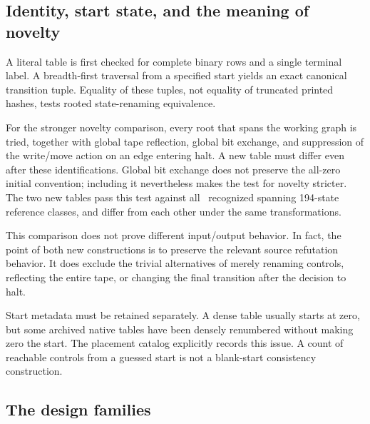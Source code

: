 \documentclass[11pt]{article}
\begin{document}
\subsection{Identity, start state, and the meaning of novelty}

A literal table is first checked for complete binary rows and a single
terminal label. A breadth-first traversal from a specified start yields an
exact canonical transition tuple. Equality of these tuples, not equality
of truncated printed hashes, tests rooted state-renaming equivalence.

For the stronger novelty comparison, every root that spans the working
graph is tried, together with global tape reflection, global bit exchange,
and suppression of the write/move action on an edge entering halt. A new
table must differ even after these identifications. Global bit exchange
does not preserve the all-zero initial convention; including it nevertheless
makes the test for novelty stricter. The two new tables pass this test
against all \FrontierClasses\ recognized spanning 194-state reference classes,
and differ from each other under the same transformations.

This comparison does not prove different input/output behavior. In fact,
the point of both new constructions is to preserve the relevant source
refutation behavior. It does exclude the trivial alternatives of merely
renaming controls, reflecting the entire tape, or changing the final
transition after the decision to halt.

Start metadata must be retained separately. A dense table usually starts at
zero, but some archived native tables have been densely renumbered without
making zero the start. The placement catalog explicitly records this issue.
A count of reachable controls from a guessed start is not a blank-start
consistency construction.

\subsection{The design families}
\end{document}
